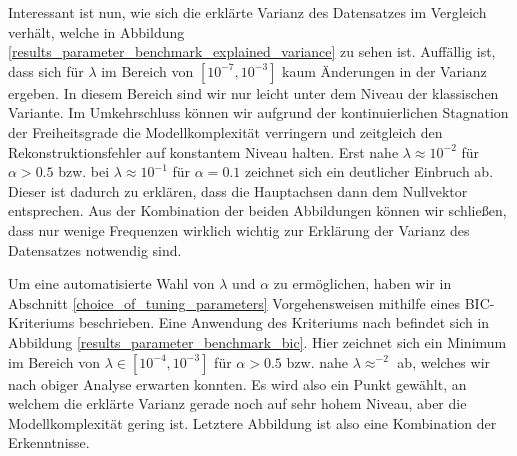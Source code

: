 Interessant ist nun, wie sich die erklärte Varianz des Datensatzes im Vergleich verhält, welche in Abbildung \ref{results_parameter_benchmark_explained_variance} zu sehen ist.  Auffällig ist, dass sich für $\lambda$ im Bereich von $[10^{-7}, 10^{-3}]$ kaum Änderungen in der Varianz ergeben. In diesem Bereich sind wir nur leicht unter dem Niveau der klassischen Variante. Im Umkehrschluss können wir aufgrund der kontinuierlichen Stagnation der Freiheitsgrade die Modellkomplexität verringern und zeitgleich den Rekonstruktionsfehler auf konstantem Niveau halten. Erst nahe $\lambda \approx 10^{-2}$ für $\alpha > 0.5$ bzw. bei $\lambda \approx 10^{-1}$ für $\alpha = 0.1$ zeichnet sich ein deutlicher Einbruch ab. Dieser ist dadurch zu erklären, dass die Hauptachsen dann dem Nullvektor entsprechen. Aus der Kombination der beiden Abbildungen können wir schließen, dass nur wenige Frequenzen wirklich wichtig zur Erklärung der Varianz des Datensatzes notwendig sind.

Um eine automatisierte Wahl von $\lambda$ und $\alpha$ zu ermöglichen, haben wir in Abschnitt \ref{choice_of_tuning_parameters} Vorgehensweisen mithilfe eines BIC-Kriteriums beschrieben. Eine Anwendung des Kriteriums nach \cite{croux, guo} befindet sich in Abbildung \ref{results_parameter_benchmark_bic}. Hier zeichnet sich ein Minimum im Bereich von $\lambda \in [10^{-4}, 10^{-3}]$ für $\alpha > 0.5$ bzw. nahe $\lambda \approx ^{-2}$ ab, welches wir nach obiger Analyse erwarten konnten. Es wird also ein Punkt gewählt, an welchem die erklärte Varianz gerade noch auf sehr hohem Niveau, aber die Modellkomplexität gering ist. Letztere Abbildung ist also eine Kombination der Erkenntnisse.

